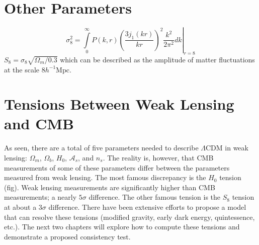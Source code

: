 \section{Other Parameters}
\begin{equation}
\sigma_8^2 = \left.\int\limits_0^\infty P(k,r)\left(\frac{3j_1(kr)}{kr}\right)^2\frac{k^2}{2\pi^2}dk\right|_{r=8}
\end{equation}
$S_8 = \sigma_8\sqrt{\Omega_m/0.3}$
which can be described as the amplitude of matter fluctuations at the scale $8 h^{-1}\mathrm{Mpc}$.
\section{Tensions Between Weak Lensing and CMB}
As seen, there are a total of five parameters needed to describe $\Lambda$CDM in weak lensing: $\Omega_m$, $\Omega_b$, $H_0$, $\mathcal{A}_s$, and $n_s$. The reality is, however, that CMB measurements of some of these parameters differ between the parameters measured from weak lensing. The most famous discrepancy is the $H_0$ tension (fig). Weak lensing measurements are significantly higher than CMB measurements; a nearly $5\sigma$ difference. The other famous tension is the $S_8$ tension at about a $3\sigma$ difference. There have been extensive efforts to propose a model that can resolve these tensions (modified gravity, early dark energy, quintessence, etc.). The next two chapters will explore how to compute these tensions and demonstrate a proposed consistency test.








